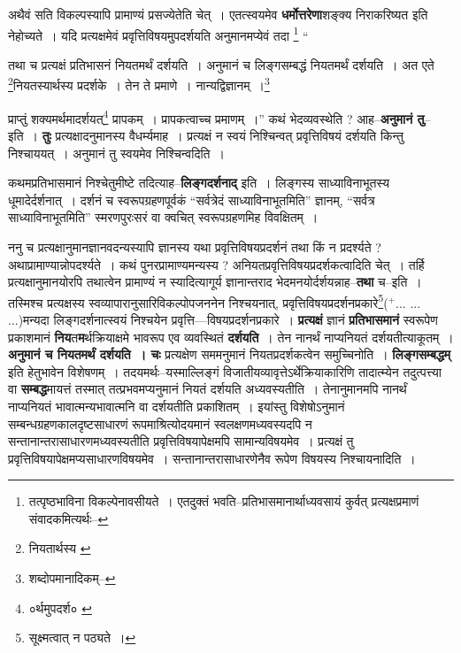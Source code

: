 \documentclass[article,12pt,a4paper]{memoir}
\newcommand{\add}[1]{($^{+}$#1)}
\begin{document}
	  \pstart अथैवं सति विकल्पस्यापि प्रामाण्यं प्रसज्येतेति चेत् । एतत्स्वयमेव \textbf{धर्मोत्तरेणा}शङ्क्य निराकरिष्यत इति नेहोच्यते । यदि प्रत्यक्षमेवं प्रवृत्तिविषयमुपदर्शयति अनुमानमप्येवं तदा  \footnote{तत्पृष्ठभाविना विकल्पेनावसीयते । एतदुक्तं भवति--प्रतिभासमानार्थाध्यवसायं कुर्वत् प्रत्यक्षप्रमाणं संवादकमित्यर्थः--\cite{dp-msD-n}}  \leavevmode{} “
	  
	तथा च प्रत्यक्षं प्रतिभासनं नियतमर्थं दर्शयति । अनुमानं च लिङ्गसम्बद्धं नियतमर्थं दर्शयति । अत एते \footnote{नियतार्थस्य \cite{dp-msB}}\-नियतस्यार्थस्य प्रदर्शके । तेन ते प्रमाणे । नान्यद्विज्ञानम् ।\footnote{शब्दोपमानादिकम्--\cite{dp-msD-n}} 
	  
	प्राप्तुं शक्यमर्थमादर्शयत्\footnote{०र्थमुपदर्श० \cite{dp-msC} \cite{dp-msD} \cite{dp-msB}} प्रापकम् । प्रापकत्वाच्च प्रमाणम् ।” कथं भेदव्यवस्थेति ? आह--\textbf{अनुमानं तु}--इति । \textbf{तुः} प्रत्यक्षादनुमानस्य वैधर्म्यमाह । प्रत्यक्षं न स्वयं निश्चिन्वत् प्रवृत्तिविषयं दर्शयति किन्तु निश्चाययत् । अनुमानं तु स्वयमेव निश्चिन्वदिति ।
	\pend
      

	  \pstart कथमप्रतिभासमानं निश्चेतुमीष्टे तदित्याह--\textbf{लिङ्गदर्शनाद्} इति । लिङ्गस्य साध्याविनाभूतस्य धूमादेर्दर्शनात् । दर्शनं च स्वरूपग्रहणपूर्वकं “सर्वत्रेदं साध्याविनाभूतमिति” ज्ञानम्, “सर्वत्र साध्याविनाभूतमिति” स्मरणपुरःसरं वा क्वचित् स्वरूपग्रहणमिह विवक्षितम् ।
	\pend
      

	  \pstart ननु च प्रत्यक्षानुमानज्ञानवदन्यस्यापि ज्ञानस्य यथा प्रवृत्तिविषयप्रदर्शनं तथा किं न प्रदर्श्यते ? अथाप्रामाण्यान्नोपदर्श्यते । कथं पुनरप्रामाण्यमन्यस्य ? अनियतप्रवृत्तिविषयप्रदर्शकत्वादिति चेत् । तर्हि प्रत्यक्षानुमानयोरपि तथात्वेन प्रामाण्यं न स्यादित्यागूर्य ज्ञानान्तराद भेदमनयोर्दर्शयन्नाह--\textbf{तथा} च--इति । तस्मिश्च प्रत्यक्षस्य स्वव्यापारानुसारिविकल्पोपजननेन निश्चयनात्, प्रवृत्तिविषयप्रदर्शनप्रकारे\footnote{सूक्ष्मत्वात् न पठ्यते ।}\add{... ... ...}मन्यदा लिङ्गदर्शनात्स्वयं निश्चयेन प्रवृत्ति—विषयप्रदर्शनप्रकारे । \textbf{प्रत्यक्षं} ज्ञानं \textbf{प्रतिभासमानं} स्वरूपेण प्रकाशमानं \textbf{निय}त\textbf{म}र्थक्रियाक्षमे भावरूप एव व्यवस्थितं \textbf{दर्शयति} । तेन नानर्थं नाप्यनियतं दर्शयतीत्याकूतम् । \textbf{अनुमानं च नियतमर्थं दर्शयति । चः} प्रत्यक्षेण सममनुमानं नियतप्रदर्शकत्वेन समुच्चिनोति । \textbf{लिङ्गसम्बद्धम्} इति हेतुभावेन विशेषणम् । तदयमर्थः--यस्माल्लिङ्गं विजातीयव्यावृत्तेऽर्थेक्रियाकारिणि तादात्म्येन तदुत्पत्त्या वा \textbf{सम्बद्ध}मायत्तं तस्मात् तत्प्रभवमप्यनुमानं नियतं दर्शयति अध्यवस्यतीति । तेनानुमानमपि नानर्थं नाप्यनियतं भावात्मन्यभावात्मनि वा दर्शयतीति प्रकाशितम् । इयांस्तु विशेषोऽनुमानं सम्बन्धग्रहणकालदृष्टसाधारणं रूपमाश्रित्योदयमानं स्वलक्षणमध्यवस्यदपि न सन्तानान्तरासाधारणमध्यवस्यतीति प्रवृत्तिविषयापेक्षमपि सामान्यविषयमेव । प्रत्यक्षं तु प्रवृत्तिविषयापेक्षमप्यसाधारणविषयमेव । सन्तानान्तरासाधा\leavevmode{}रणेनैव रूपेण विषयस्य निश्चायनादिति ।
	\pend
      
\end{document}
